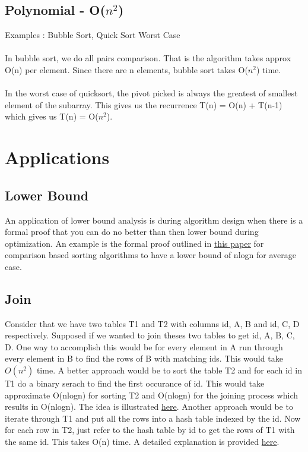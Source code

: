 \subsection{Polynomial - O($n^2$)}
Examples : Bubble Sort, Quick Sort Worst Case
\\\\In bubble sort, we do all pairs comparison. That is the algorithm takes approx O(n) per element. Since there are n elements, bubble sort takes O($n^2$) time.
\\\\In the worst case of quicksort, the pivot picked is always the greatest of smallest element of the subarray. This gives us the recurrence T(n) = O(n) + T(n-1) which gives us T(n) = O($n^2$).


\section{Applications}

\subsection{Lower Bound}
An application of lower bound analysis is during algorithm design when there is a formal proof that you can do no better than then lower bound during optimization. An example is the formal proof outlined in \href{https://www.cs.cmu.edu/~avrim/451f11/lectures/lect0913.pdf}{this paper} for comparison based sorting algorithms to have a lower bound of nlogn for average case.

\subsection{Join}
Consider that we have two tables T1 and T2 with columns id, A, B and id, C, D respectively. Supposed if we wanted to join theses two tables to get id, A, B, C, D. One way to accomplish this would be for every element in A run through every element in B to find the rows of B with matching ids. This would take $O(n^2)$ time. A better approach would be to sort the table T2 and for each id in T1 do a binary serach to find the first occurance of id. This would take approximate O(nlogn) for sorting T2 and O(nlogn) for the joining process which results in O(nlogn). The idea is illustrated \href{https://en.wikipedia.org/wiki/Sort-merge_join}{here}. Another approach would be to iterate through T1 and put all the rows into a hash table indexed by the id. Now for each row in T2, just refer to the hash table by id to get the rows of T1 with the same id. This takes O(n) time. A detailed explanation is provided \href{https://en.wikipedia.org/wiki/Hash_join}{here}.

